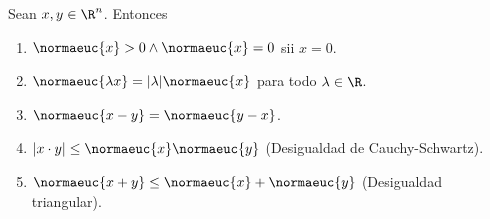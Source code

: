 \begin{teo}
    Sean $x, y \in \R^n$. Entonces
    
    \begin{enumerate}
        \item $\normaeuc{x} > 0 \wedge \normaeuc{x} = 0$ sii $x = 0$.
        \item $\normaeuc{\lambda x} = |\lambda| \normaeuc{x}$ para todo $\lambda \in \R$.
        \item $\normaeuc{x-y} = \normaeuc{y-x}$.
        \item $|x \cdot y| \leq \normaeuc{x}\normaeuc{y}$ (Desigualdad de Cauchy-Schwartz).
        \item $\normaeuc{x + y} \leq \normaeuc{x} + \normaeuc{y}$ (Desigualdad triangular).
    \end{enumerate}
\end{teo}

